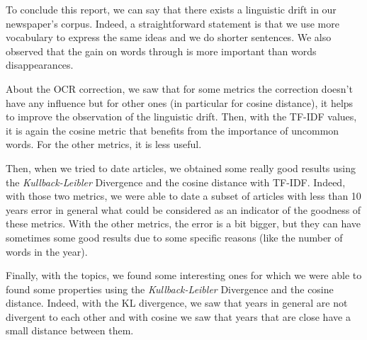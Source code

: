 To conclude this report, we can say that there exists a linguistic drift in our newspaper's corpus. Indeed, a straightforward statement is that we use more vocabulary to express the same ideas and we do shorter sentences. We also observed that the gain on words through is more important than words disappearances.

About the OCR correction, we saw that for some metrics the correction doesn't have any influence but for other ones (in particular for cosine distance), it helps to improve the observation of the linguistic drift. Then, with the TF-IDF values, it is again the cosine metric that benefits from the importance of uncommon words. For the other metrics, it is less useful.

Then, when we tried to date articles, we obtained some really good results using the \emph{Kullback-Leibler} Divergence and the cosine distance with TF-IDF. Indeed, with those two metrics, we were able to date a subset of articles with less than 10 years error in general what could be considered as an indicator of the goodness of these metrics. With the other metrics, the error is a bit bigger, but they can have sometimes some good results due to some specific reasons (like the number of words in the year).

Finally, with the topics, we found some interesting ones for which we were able to found some properties using the \emph{Kullback-Leibler} Divergence and the cosine distance. Indeed, with the KL divergence, we saw that years in general are not divergent to each other and with cosine we saw that years that are close have a small distance between them.
